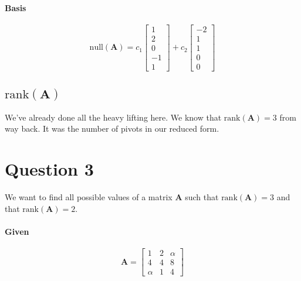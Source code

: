 \documentclass{article}
\begin{document}
            \paragraph{Basis}
                \[
                    \text{null}(\mathbf{A})=c_1\begin{bmatrix}1\\2\\0\\-1\\1\end{bmatrix}+c_2\begin{bmatrix}-2\\1\\1\\0\\0\end{bmatrix}
                \]
        \subsection[The rank of A]{$\text{rank}(\mathbf{A})$}
            We've already done all the heavy lifting here. We know that $\text{rank}(\mathbf{A})=3$ from way back.
            It was the number of pivots in our reduced form.
    \section{Question 3}
        We want to find all possible values of a matrix $\mathbf{A}$ such that $\text{rank}(\mathbf{A})=3$ and that $\text{rank}(\mathbf{A})=2$.
        \paragraph{Given}
            \[
                \mathbf{A}=\begin{bmatrix}1&2&\alpha\\4&4&8\\\alpha&1&4\end{bmatrix}
            \]
\end{document}
